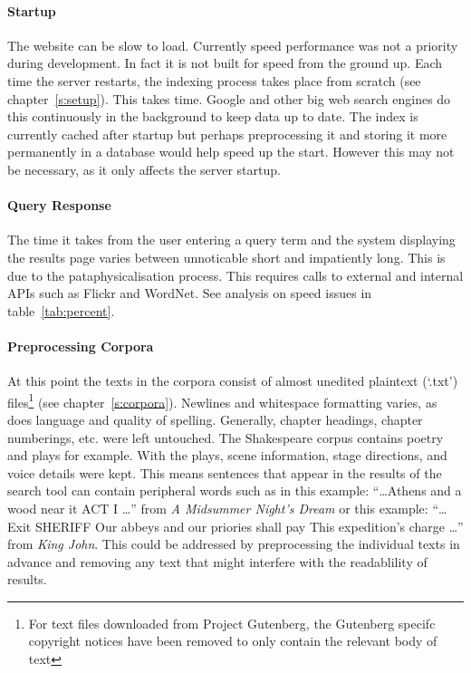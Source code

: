 \paragraph{Startup} 
The website can be slow to load. Currently speed performance was not a priority during development. In fact it is not built for speed from the ground up. Each time the server restarts, the indexing process takes place from scratch (see chapter~\ref{s:setup}). This takes time. Google and other big web search engines do this continuously in the background to keep data up to date. The index is currently cached after startup but perhaps preprocessing it and storing it more permanently in a database would help speed up the start. However this may not be necessary, as it only affects the server startup.

\paragraph{Query Response} 
The time it takes from the user entering a query term and the system displaying the results page varies between unnoticable short and impatiently long. This is due to the pataphysicalisation process. This requires calls to external and internal \ac{API}s such as Flickr and WordNet. See analysis on speed issues in table~\ref{tab:percent}.

\paragraph{Preprocessing Corpora} 
At this point the texts in the corpora consist of almost unedited plaintext (`.txt') files\footnote{For text files downloaded from Project Gutenberg, the Gutenberg specifc copyright notices have been removed to only contain the relevant body of text} (see chapter~\ref{s:corpora}). Newlines and whitespace formatting varies, as does language and quality of spelling. Generally, chapter headings, chapter numberings, etc. were left untouched. The Shakespeare corpus contains poetry and plays for example. With the plays, scene information, stage directions, and voice details were kept. This means sentences that appear in the results of the search tool can contain peripheral words such as in this example: ``\ldots Athens and a wood near it ACT I \ldots'' from \textit{A Midsummer Night's Dream} or this example: ``\ldots Exit SHERIFF Our abbeys and our priories shall pay This expedition's charge \ldots'' from \textit{King John}. This could be addressed by preprocessing the individual texts in advance and removing any text that might interfere with the readablility of results.

